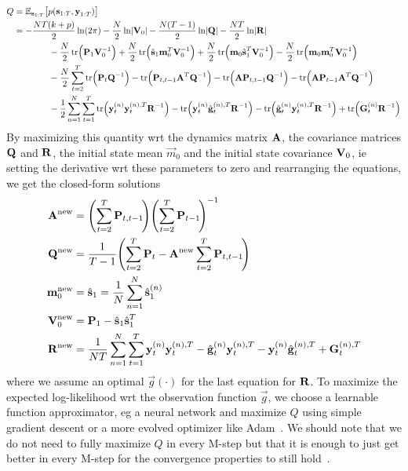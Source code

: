 	\begin{align*}
		Q
			&= \E_{\vec{s}_{1:T}}\big[ p(\vec{s}_{1:T}, \vec{y}_{1:T}) \big] \\
			&= -\frac{NT(k + p)}{2} \ln(2\pi) - \frac{N}{2} \ln \lvert \mat{V}_0 \rvert - \frac{N(T - 1)}{2} \ln \lvert \mat{Q} \rvert - \frac{NT}{2} \ln \lvert \mat{R} \rvert \\
			&\qquad\qquad -\frac{N}{2} \tr\!\Big( \mat{P}_1 \mat{V}_0^{-1} \Big) + \frac{N}{2} \tr\!\Big( \hat{\vec{s}}_1 \vec{m}_0^T \mat{V}_0^{-1} \Big) + \frac{N}{2} \tr\!\Big( \vec{m}_0 \hat{\vec{s}}_1^T \mat{V}_0^{-1} \Big) - \frac{N}{2} \tr\!\Big(\vec{m}_0 \vec{m}_0^T \mat{V}_0^{-1} \Big) \\
			&\qquad\qquad -\frac{N}{2} \sum_{t = 2}^{T} \tr\!\Big( \mat{P}_t \mat{Q}^{-1} \Big) - \tr\!\Big( \mat{P}_{t, t - 1} \mat{A}^T \mat{Q}^{-1} \Big) - \tr\!\Big( \mat{A} \mat{P}_{t, t - 1} \mat{Q}^{-1} \Big) - \tr\!\Big( \mat{A} \mat{P}_{t - 1} \mat{A}^T \mat{Q}^{-1} \Big) \\
			&\qquad\qquad -\frac{1}{2} \sum_{n = 1}^{N} \sum_{t = 1}^{T} \tr\!\Big( \vec{y}_t^{(n)} \vec{y}_t^{(n), T} \mat{R}^{-1} \Big) - \tr\!\Big( \vec{y}_t^{(n)} \hat{\vec{g}}_t^{(n), T} \mat{R}^{-1} \Big) - \tr\!\Big( \hat{\vec{g}}_t^{(n)} \vec{y}_t^{(n), T} \mat{R}^{-1} \Big) + \tr\!\Big( \mat{G}_t^{(n)} \mat{R}^{-1} \Big)
	\end{align*}
	By maximizing this quantity \ac{wrt} the dynamics matrix \(\boldsymbol{\mathrm{A}}\), the covariance matrices \(\boldsymbol{\mathrm{Q}}\) and \(\boldsymbol{\mathrm{R}}\), the initial state mean \(\vec{m}_0\) and the initial state covariance \(\boldsymbol{\mathrm{V}}_0\), \ac{ie} setting the derivative \ac{wrt} these parameters to zero and rearranging the equations, we get the closed-form solutions
	\begin{align*}
		\boldsymbol{\mathrm{A}}^{\mathrm{new}}   &= \Bigg(\! \sum_{t = 2}^{T} \boldsymbol{\mathrm{P}}_{t, t - 1} \!\Bigg) \Bigg(\! \sum_{t = 2}^{T} \boldsymbol{\mathrm{P}}_{t - 1} \!\Bigg)^{-1} \\
		\boldsymbol{\mathrm{Q}}^{\mathrm{new}}   &= \frac{1}{T - 1} \Bigg(\! \sum_{t = 2}^{T} \boldsymbol{\mathrm{P}}_t - \boldsymbol{\mathrm{A}}^{\mathrm{new}} \sum_{t = 2}^{T} \boldsymbol{\mathrm{P}}_{t, t - 1} \!\Bigg) \\
		\boldsymbol{\mathrm{m}}_0^{\mathrm{new}} &= \hat{\boldsymbol{\mathrm{s}}}_1 = \frac{1}{N} \sum_{n = 1}^{N} \hat{\boldsymbol{\mathrm{s}}}_1^{(n)} \\
		\boldsymbol{\mathrm{V}}_0^{\mathrm{new}} &= \boldsymbol{\mathrm{P}}_1 - \hat{\boldsymbol{\mathrm{s}}}_1 \hat{\boldsymbol{\mathrm{s}}}_1^T \\
		\boldsymbol{\mathrm{R}}^{\mathrm{new}}   &= \frac{1}{NT} \sum_{n = 1}^{N} \sum_{t = 1}^{T} \boldsymbol{\mathrm{y}}_t^{(n)} \boldsymbol{\mathrm{y}}_t^{(n), T} - \hat{\boldsymbol{\mathrm{g}}}_t^{(n)} \boldsymbol{\mathrm{y}}_t^{(n), T} - \boldsymbol{\mathrm{y}}_t^{(n)} \hat{\boldsymbol{\mathrm{g}}}_t^{(n), T} + \boldsymbol{\mathrm{G}}_t^{(n), T}
	\end{align*}
	where we assume an optimal \( \vec{g}(\cdot) \) for the last equation for \(\boldsymbol{\mathrm{R}}\). To maximize the expected log-likelihood \ac{wrt} the observation function \( \vec{g} \), we choose a learnable function approximator, \ac{eg} a neural network and maximize \(Q\) using simple gradient descent or a more evolved optimizer like Adam~\cite{kingmaAdamMethodStochastic2017}. We should note that we do not need to fully maximize \(Q\) in every M-step but that it is enough to just get better in every M-step for the convergence properties to still hold~\cite{dempsterMaximumLikelihoodIncomplete1977a}.

